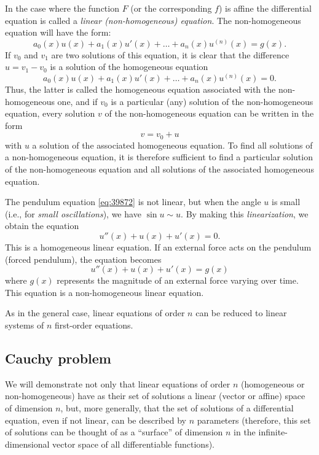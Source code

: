 In the case where the function $F$ (or the corresponding $f$)
is affine 
the differential equation
is called a
%
%
\emph{linear (non-homogeneous) equation}.
The non-homogeneous equation will have the form:
\[
  a_0(x) u(x) + a_1(x) u'(x) + \dots + a_n(x) u^{(n)}(x) = g(x).
\]
If $v_0$ and $v_1$ are two solutions of this equation, it is clear that the
difference $u=v_1 - v_0$ is a solution of the homogeneous equation
\[
  a_0(x) u(x) + a_1(x) u'(x) + \dots + a_n(x) u^{(n)}(x) = 0.
\]
Thus, the latter is called the homogeneous equation associated with the
non-homogeneous one,
and if $v_0$ is a particular (any) solution of the non-homogeneous equation,
every solution $v$ of the non-homogeneous equation can be written in the form
\[
  v = v_0 + u
\]
with $u$ a solution of the associated homogeneous equation.
To find all solutions of a non-homogeneous equation, it is therefore
sufficient to find a particular solution of the non-homogeneous equation 
and all solutions of the associated homogeneous equation.

The pendulum equation \eqref{eq:39872} is not linear,
but when the angle $u$ is small (i.e., for \emph{small oscillations}), we have
$\sin u \sim u$.
By making this \emph{linearization}, we obtain the equation
\[
  u''(x)  + u(x) + u'(x) = 0.
\]
This is a homogeneous linear equation.
If an external force acts on the pendulum (forced pendulum), the equation
becomes
\[
  u''(x) + u(x) + u'(x) = g(x)
\]
where $g(x)$ represents the magnitude of an external force varying over time.
This equation is a non-homogeneous linear equation.

As in the general case, linear equations of order $n$ can be reduced
to linear systems of $n$ first-order equations.

\subsection{Cauchy problem}

We will demonstrate not only that linear equations of order $n$ (homogeneous or
non-homogeneous)
have as their set 
of solutions a linear (vector or affine) space of dimension $n$, 
but, more generally, that the set of solutions of a differential equation, 
even if not linear, can be described by $n$ parameters
(therefore, this set of solutions can be thought of as a ``surface'' 
of dimension $n$ in the infinite-dimensional vector space 
of all differentiable functions).

